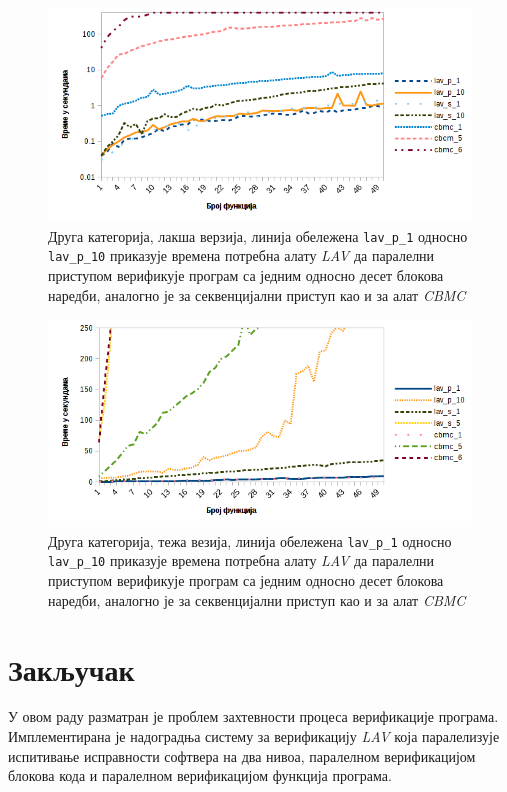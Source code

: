 \documentclass[12pt,oneside]{memoir}
\begin{document}
\begin{figure}[!ht]
  \centering
  \includegraphics[scale=0.8]{img/nivo2_master.png}
  \caption{Друга категорија, лакша верзија, линија обележена \texttt{lav\_p\_1} односно \texttt{lav\_p\_10} приказује времена потребна алату \textit{LAV} да паралелни приступом верификује програм са једним односно десет блокова наредби, аналогно је за секвенцијални приступ као и за алат \textit{CBMC}}
  \label{fig:nivo_2}
\end{figure}

\begin{figure}[!ht]
  \centering
  \includegraphics[scale=0.8]{img/nivo2T_master.png}
  \caption{Друга категорија, тежа везија, линија обележена \texttt{lav\_p\_1} односно \texttt{lav\_p\_10} приказује времена потребна алату \textit{LAV} да паралелни приступом верификује програм са једним односно десет блокова наредби, аналогно је за секвенцијални приступ као и за алат \textit{CBMC}}
  \label{fig:nivo_2t}
\end{figure}


\chapter{Закључак} 

У овом раду разматран је проблем захтевности процеса верификације програма. Имплементирана је надоградња систему за верификацију \textit{LAV} која паралелизује испитивање исправности софтвера на два нивоа, паралелном верификацијом блокова кода и паралелном верификацијом функција програма.
\end{document}
